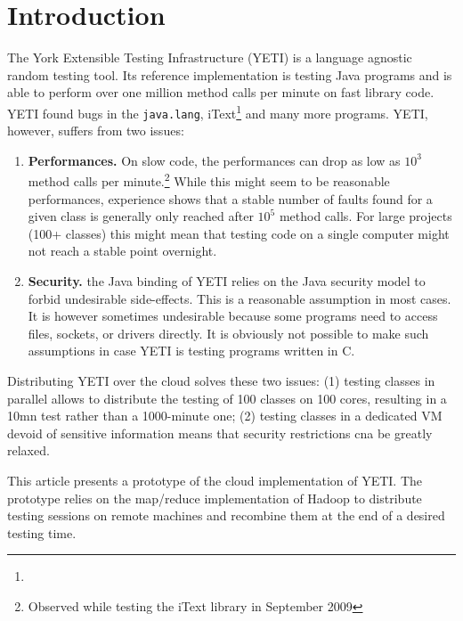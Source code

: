 \section{Introduction}
The York Extensible Testing Infrastructure (YETI) is a language agnostic 
random testing tool. Its reference implementation is testing Java programs
and is able to perform over one million method calls per minute on fast library
code. YETI found bugs in the \texttt{java.lang}, iText\footnote{} and many more 
programs. YETI, however, suffers from two issues:
\begin{enumerate}
\item \textbf{Performances.} On slow code, the performances can drop as low as $10^{3}$
method calls per minute.\footnote{Observed while testing the iText library in 
September 2009} While this might seem to be reasonable performances, experience shows 
that a stable number of faults found for a given class is generally only reached after 
$10^{5}$ method calls. For large projects (100+ classes) this might mean that testing 
code on a single computer might not reach a stable point overnight.
\item \textbf{Security.} the Java binding of YETI relies on the Java security model to forbid 
undesirable side-effects. This is a reasonable assumption in most cases. It is however
sometimes undesirable because some programs need to access files, sockets, or drivers 
directly. It is obviously not possible to make such assumptions in case YETI is testing 
programs written in C.
\end{enumerate}

Distributing YETI over the cloud solves these two issues: (1) testing classes in parallel
allows to distribute the testing of 100 classes on 100 cores, resulting in a 10mn test 
rather than a 1000-minute one; (2) testing classes in a dedicated VM devoid of sensitive 
information means that security restrictions cna be greatly relaxed.

This article presents a prototype of the cloud implementation of YETI. The prototype relies
on the map/reduce implementation of Hadoop to distribute testing sessions on remote machines 
and recombine them at the end of a desired testing time.
